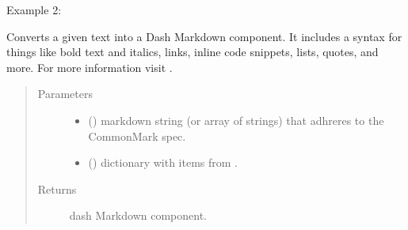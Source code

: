 \documentclass[letterpaper,10pt,english]{sphinxmanual}
\begin{document}
\begin{fulllineitems}
Example 2:

\begin{sphinxVerbatim}[commandchars=\\\{\}]
        
\end{sphinxVerbatim}

\end{fulllineitems}


\begin{fulllineitems}
\label{\detokenize{_autosummary/analytics_core.viz:analytics_core.viz.viz.get_markdown}}
Converts a given text into a Dash Markdown component. It includes a syntax for things like bold text and italics, links, inline code snippets, lists, quotes, and more.
For more information visit .
\begin{quote}\begin{description}
\item[{Parameters}] \leavevmode\begin{itemize}
\item {} 
 () \textendash{} markdown string (or array of strings) that adhreres to the CommonMark spec.

\item {} 
 () \textendash{} dictionary with items from .

\end{itemize}

\item[{Returns}] \leavevmode
dash Markdown component.

\end{description}\end{quote}

\end{fulllineitems}
\end{document}

